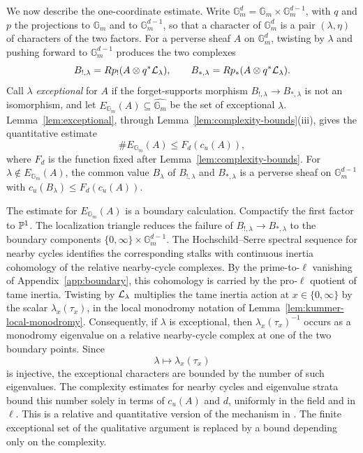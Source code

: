 \documentclass[12pt,reqno]{amsart}
\theoremstyle{definition}
\theoremstyle{plain}
\theoremstyle{definition}
\theoremstyle{remark}
\newcommand{\bbG}{\mathbb{G}}  \newcommand{\bbH}{\mathbb{H}}
\newcommand{\Gm}{\bbG_m}
\newcommand{\cu}{c_u}
\begin{document}
We now describe the one-coordinate estimate.  Write
\(\Gm^d=\Gm\times\Gm^{d-1}\), with \(q\) and \(p\) the projections to \(\Gm\) and to \(\Gm^{d-1}\), so
that a character of \(\Gm^d\) is a pair \((\lambda,\eta)\) of characters of the two factors.  For a
perverse sheaf \(A\) on \(\Gm^d\), twisting by \(\lambda\) and pushing forward to \(\Gm^{d-1}\)
produces the two complexes
\[
        B_{!,\lambda}=Rp_!(A\otimes q^*\mathcal{L}_\lambda),
        \qquad B_{*,\lambda}=Rp_*(A\otimes q^*\mathcal{L}_\lambda).
\]
Call \(\lambda\) \emph{exceptional} for \(A\) if the forget-supports morphism
\(B_{!,\lambda}\to B_{*,\lambda}\) is not an isomorphism, and let \(E_{\Gm}(A)\subseteq\widehat{\Gm}\)
be the set of exceptional \(\lambda\).  Lemma~\ref{lem:exceptional}, through
Lemma~\ref{lem:complexity-bounds}(iii), gives the quantitative estimate
\[
        \#E_{\Gm}(A)\le F_{d}(\cu(A)),
\]
where \(F_{d}\) is the function fixed after Lemma~\ref{lem:complexity-bounds}.  For
\(\lambda\notin E_{\Gm}(A)\), the common value \(B_\lambda\) of \(B_{!,\lambda}\) and
\(B_{*,\lambda}\) is a perverse sheaf on \(\Gm^{d-1}\) with \(\cu(B_\lambda)\le F_{d}(\cu(A))\).

The estimate for \(E_{\Gm}(A)\) is a boundary calculation.  Compactify the first factor to
\(\mathbb{P}^1\).  The localization triangle reduces the failure of \(B_{!,\lambda}\to B_{*,\lambda}\) to
the boundary components \(\{0,\infty\}\times\Gm^{d-1}\).  The Hochschild--Serre spectral sequence
for nearby cycles \cite[\textit{Th\'eor\`emes de finitude}, Lem.~3.11]{SGA45} identifies the
corresponding stalks with continuous inertia cohomology of the relative nearby-cycle complexes.
By the prime-to-\(\ell\) vanishing of Appendix~\ref{app:boundary}, this cohomology is carried by
the pro-\(\ell\) quotient of tame inertia.
Twisting by \(\mathcal{L}_\lambda\) multiplies the tame inertia action at \(x\in\{0,\infty\}\) by the scalar
\(\lambda_x(\tau_x)\), in the local monodromy notation of Lemma~\ref{lem:kummer-local-monodromy}.
Consequently, if \(\lambda\) is exceptional, then \(\lambda_x(\tau_x)^{-1}\) occurs as a monodromy
eigenvalue on a relative nearby-cycle complex at one of the two boundary points.  Since
\[
        \lambda\longmapsto\lambda_x(\tau_x)
\]
is injective, the exceptional characters are bounded by the number of such eigenvalues.  The
complexity estimates for nearby cycles and eigenvalue strata bound this number solely in terms of
\(\cu(A)\) and \(d\), uniformly in the field and in \(\ell\).  This is a relative and quantitative
version of the mechanism in \cite[(6.5.1)]{KatzLaumon1985}.  The finite exceptional set of the
qualitative argument is replaced by a bound depending only on the complexity.
\end{document}
